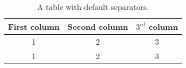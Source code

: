 \begin{table}[h]
    \centering
    \begin{tabular}{ccc}
        \hline
        First column & Second column & $\mathrm{3^{rd}}$ column
        \tabularnewline\hline
        1 & 2 & 3
        \tabularnewline
        1 & 2 & 3
        \tabularnewline\hline
    \end{tabular}
    \caption{A table with default separators.}
    \label{tab:table1}
\end{table}
